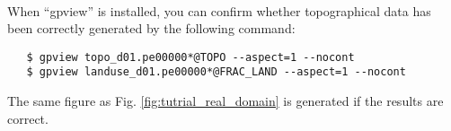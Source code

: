 \vspace{1cm}
 \hrulefill \\
When ``gpview'' is installed, you can confirm whether topographical data 
has been correctly generated by the following command:
 \begin{verbatim}
   $ gpview topo_d01.pe00000*@TOPO --aspect=1 --nocont
   $ gpview landuse_d01.pe00000*@FRAC_LAND --aspect=1 --nocont
 \end{verbatim}
The same figure as Fig. \ref{fig:tutrial_real_domain} is generated
if the results are correct.

